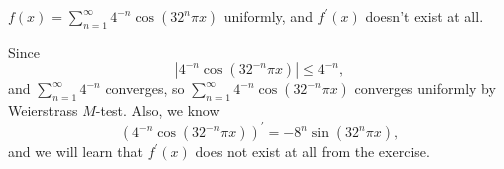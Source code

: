 \begin{eg}
    \(f(x) = \sum_{n=1}^{\infty} 4^{-n} \cos \left( 32^n \pi x \right)  \)  uniformly, and \(f^{\prime} (x)\) doesn't exist at all. 
\end{eg}
\begin{explanation}
    Since 
    \[
        \left\vert 4^{-n} \cos \left( 32^{-n} \pi x \right)  \right\vert \le 4^{-n},
    \] and \(\sum_{n=1}^{\infty} 4^{-n} \) converges, so \(\sum_{n=1}^{\infty} 4^{-n} \cos \left( 32^{-n} \pi x \right)  \) converges uniformly by Weierstrass \(M\)-test. Also, we know 
    \[
        \left( 4^{-n} \cos \left( 32^{-n} \pi x \right)  \right)^{\prime} = -8^n \sin \left( 32^n \pi x \right),  
    \]  and we will learn that \(f^{\prime} (x)\) does not exist at all from the exercise. 
\end{explanation}